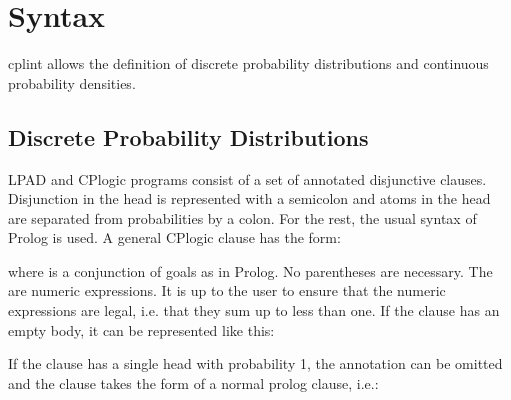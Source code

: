 \documentclass[letterpaper,10pt,english]{sphinxmanual}
\begin{document}
\chapter{Syntax}
\label{\detokenize{index:syntax}}
\sphinxAtStartPar
cplint allows the definition of discrete probability distributions and continuous probability densities.


\section{Discrete Probability Distributions}
\label{\detokenize{index:discrete-probability-distributions}}
\sphinxAtStartPar
LPAD and CP\sphinxhyphen{}logic programs consist of a set of annotated disjunctive clauses.
Disjunction in the head is represented with a semicolon and atoms in the head are separated from probabilities by a colon.
For the rest, the usual syntax of Prolog is used.
A general CP\sphinxhyphen{}logic clause has the form:

\begin{sphinxVerbatim}[commandchars=\\\{\}]
      
\end{sphinxVerbatim}

\sphinxAtStartPar
where  is a conjunction of goals as in Prolog.
No parentheses are necessary.
The  are numeric expressions.
It is up to the user to ensure that the numeric expressions are legal, i.e. that they sum up to less than one.
If the clause has an empty body, it can be represented like this:

\begin{sphinxVerbatim}[commandchars=\\\{\}]
    
\end{sphinxVerbatim}

\sphinxAtStartPar
If the clause has a single head with probability 1, the annotation can be omitted and the clause takes
the form of a normal prolog clause, i.e.:

\begin{sphinxVerbatim}[commandchars=\\\{\}]
  
\end{sphinxVerbatim}
\end{document}
